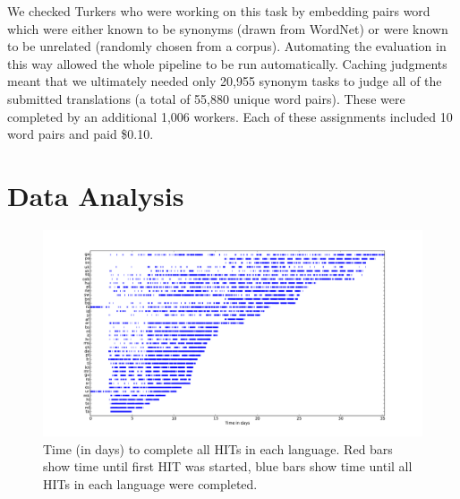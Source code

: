 \documentclass[11pt]{article}
\begin{document}
We checked Turkers who were working on this task by embedding pairs word which were either known to be synonyms (drawn from WordNet) or were known to be unrelated (randomly chosen from a corpus). 
Automating the evaluation in this way allowed the whole pipeline to be run automatically.  Caching judgments meant that we ultimately needed only 
20,955 synonym tasks to judge all of the submitted translations (a total of 55,880 unique word pairs).  These were completed by an additional 1,006 workers.  Each of these assignments included 10 word pairs and paid \$0.10.
\section{Data Analysis}


\begin{figure}[h]
\centering
\includegraphics[height=\linewidth,angle=270]{figures/completiontime}
\caption{Time (in days) to complete all HITs in each language. Red bars show time until first HIT was started,
 blue bars show time until all HITs in each language were completed.}
\label{completion-time}
\end{figure}
\end{document}
